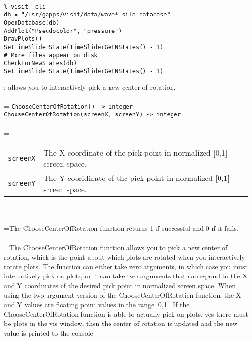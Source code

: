 \documentclass[10pt,a4paper]{report}
\begin{document}
\\[-6mm]
\begin{verbatim}% visit -cli
db = "/usr/gapps/visit/data/wave*.silo database"
OpenDatabase(db)
AddPlot("Pseudocolor", "pressure")
DrawPlots()
SetTimeSliderState(TimeSliderGetNStates() - 1)
# More files appear on disk
CheckForNewStates(db)
SetTimeSliderState(TimeSliderGetNStates() - 1)
\end{verbatim}
\newpage


{}
: allows you to interactively pick a new center of rotation.\\[-3mm]

 \\ 
\hangindent=\parindent 
\verb!ChooseCenterOfRotation() -> integer!\\ 
\verb!ChooseCenterOfRotation(screenX, screenY) -> integer!\\ [-3mm]

 \\ 
\hangindent=\parindent 
\begin{tabular}{lp{9cm}}
\verb!screenX! & The X coordinate of the pick point in normalized [0,1] screen space. \\
\verb!screenY! & The Y cooridinate of the pick point in normalized [0,1] screen space. \\
\end{tabular} \\[-2mm]


 \\ 
\hangindent=\parindent The ChooseCenterOfRotation function returns 1 if successful and 0 if it fails. \\[-3mm] 

 \\ 
\hangindent=\parindent The ChooseCenterOfRotation function allows you to pick a new center of rotation, which is the point about which plots are rotated when you interactively rotate plots. The function can either take zero arguments, in which case you must interactively pick on plots, or it can take two arguments that correspond to the X and Y coordinates of the desired pick point in normalized screen space. When using the two argument version of the ChooseCenterOfRotation function, the X and Y values are floating point values in the range [0,1]. If the ChooseCenterOfRotation function is able to actually pick on plots, yes there must be plots in the vis window, then the center of rotation is updated and the new value is printed to the console. \\[-3mm] 
\end{document}
